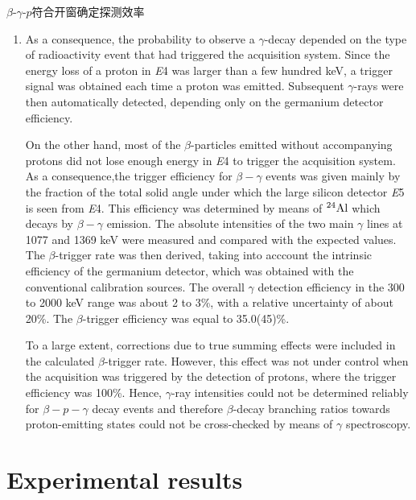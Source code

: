 \documentclass[UTF8]{ctexart}
\begin{document}
$\beta$-$\gamma$-$p$符合开窗确定探测效率
\begin{enumerate}
    \item As a consequence, the probability to observe a $\gamma$-decay depended on the type of radioactivity event that had triggered the acquisition system. Since the energy loss of a proton in \textit{E}4 was larger than a few hundred keV, a trigger signal was obtained each time a proton was emitted. Subsequent $\gamma$-rays were then automatically detected, depending only on the germanium detector efficiency.

    On the other hand, most of the $\beta$-particles emitted without accompanying protons did not lose enough energy in \textit{E}4 to trigger the acquisition system. As a consequence,the trigger efficiency for $\beta-\gamma $ events was given mainly by the fraction of the total solid angle under which the large silicon detector \textit{E}5 is seen from \textit{E}4. This efficiency was determined by means of $^{24}\textnormal{Al}$ which decays by $\beta-\gamma $ emission. The absolute intensities of the two main $\gamma$ lines at 1077 and 1369 keV were measured and compared with the expected values. The $\beta$-trigger rate was then derived, taking into acccount the intrinsic efficiency of the germanium detector, which was obtained with the conventional calibration sources. The overall $\gamma$ detection efficiency in the 300 to 2000 keV range was about 2 to 3\%, with a relative uncertainty of about 20\%. The $\beta$-trigger efficiency was equal to 35.0(45)\%.

    To a large extent, corrections due to true summing effects were included in the calculated $\beta$-trigger rate. However, this effect was not under control when the acquisition was triggered by the detection of protons, where the trigger efficiency was 100\%. Hence, $\gamma$-ray intensities could not be determined reliably for $\beta-p-\gamma $ decay events and therefore $\beta$-decay branching ratios towards proton-emitting states could not be cross-checked by means of $\gamma$ spectroscopy.
\end{enumerate}

\section{Experimental results}
\end{document}
